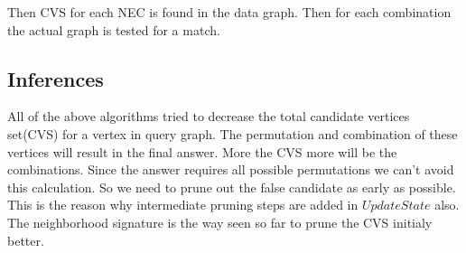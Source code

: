 	\hspace{10mm}Then CVS for each NEC is found in the data graph. Then for each combination the actual graph is tested for a match. 


\subsection{Inferences}
\label{sec:findings}
	\hspace{10mm}All of the above algorithms tried to decrease the total candidate vertices set(CVS) for a vertex in query graph. The permutation and combination of these vertices will result in the final answer. More the CVS more will be the combinations. Since the answer requires all possible permutations we can't avoid this calculation. So we need to prune out the false candidate as early as possible. This is the reason why intermediate pruning steps are added in $UpdateState$ also. The neighborhood signature is the way seen so far to prune the CVS initialy better.

